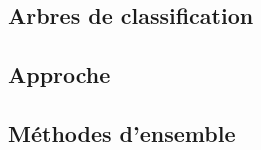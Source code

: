 \documentclass[10pt, french]{article}
\begin{document}
\begin{multicols*}{2}
\section{Arbres de classification}

\subsection{Approche}



\subsection{Méthodes d'ensemble}






\end{multicols*}
\end{document}
